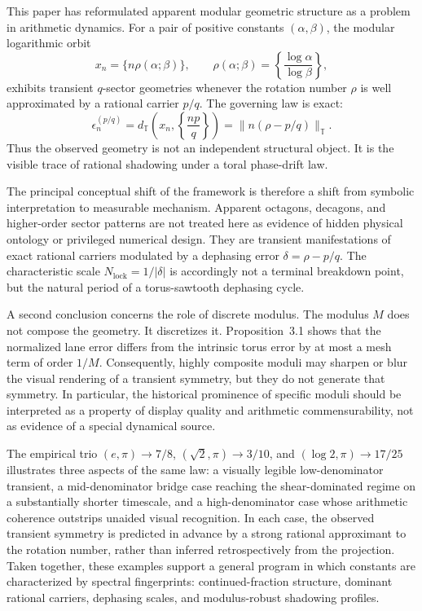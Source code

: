 \documentclass[11pt]{article}
\newcommand{\T}{\mathbb{T}}
\begin{document}
This paper has reformulated apparent modular geometric structure as a problem in arithmetic dynamics. For a pair of positive constants $(\alpha,\beta)$, the modular logarithmic orbit
\[
x_n=\{n\rho(\alpha;\beta)\},
\qquad
\rho(\alpha;\beta)=\left\{\frac{\log \alpha}{\log \beta}\right\},
\]
exhibits transient $q$-sector geometries whenever the rotation number $\rho$ is well approximated by a rational carrier $p/q$. The governing law is exact:
\[
\epsilon_n^{(p/q)}
=
d_{\T}\!\left(x_n,\left\{\frac{np}{q}\right\}\right)
=
\lVert n(\rho-p/q)\rVert_{\T}.
\]
Thus the observed geometry is not an independent structural object. It is the visible trace of rational shadowing under a toral phase-drift law.

The principal conceptual shift of the framework is therefore a shift from symbolic interpretation to measurable mechanism. Apparent octagons, decagons, and higher-order sector patterns are not treated here as evidence of hidden physical ontology or privileged numerical design. They are transient manifestations of exact rational carriers modulated by a dephasing error $\delta=\rho-p/q$. The characteristic scale $N_{\mathrm{lock}}=1/|\delta|$ is accordingly not a terminal breakdown point, but the natural period of a torus-sawtooth dephasing cycle.

A second conclusion concerns the role of discrete modulus. The modulus $M$ does not compose the geometry. It discretizes it. Proposition~3.1 shows that the normalized lane error differs from the intrinsic torus error by at most a mesh term of order $1/M$. Consequently, highly composite moduli may sharpen or blur the visual rendering of a transient symmetry, but they do not generate that symmetry. In particular, the historical prominence of specific moduli should be interpreted as a property of display quality and arithmetic commensurability, not as evidence of a special dynamical source.

The empirical trio $(e,\pi)\to 7/8$, $(\sqrt{2},\pi)\to 3/10$, and $(\log 2,\pi)\to 17/25$ illustrates three aspects of the same law: a visually legible low-denominator transient, a mid-denominator bridge case reaching the shear-dominated regime on a substantially shorter timescale, and a high-denominator case whose arithmetic coherence outstrips unaided visual recognition. In each case, the observed transient symmetry is predicted in advance by a strong rational approximant to the rotation number, rather than inferred retrospectively from the projection. Taken together, these examples support a general program in which constants are characterized by spectral fingerprints: continued-fraction structure, dominant rational carriers, dephasing scales, and modulus-robust shadowing profiles.
\end{document}
